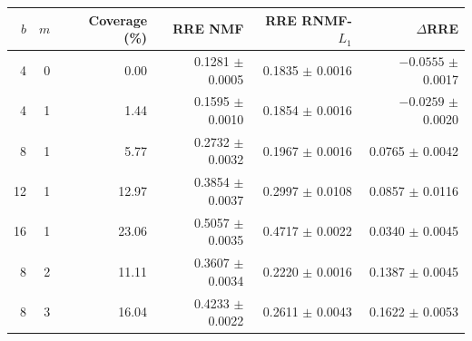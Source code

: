 \begin{tabular}{rrrrrr}
\toprule
$b$ & $m$ & Coverage (\%) & RRE NMF & RRE RNMF-$L_1$ & $\Delta$RRE \\
\midrule
4  & 0 & 0.00  & 0.1281 $\pm$ 0.0005 & 0.1835 $\pm$ 0.0016 & $-0.0555$ $\pm$ 0.0017 \\
4  & 1 & 1.44  & 0.1595 $\pm$ 0.0010 & 0.1854 $\pm$ 0.0016 & $-0.0259$ $\pm$ 0.0020 \\
8  & 1 & 5.77  & 0.2732 $\pm$ 0.0032 & 0.1967 $\pm$ 0.0016 & 0.0765 $\pm$ 0.0042 \\
12 & 1 & 12.97 & 0.3854 $\pm$ 0.0037 & 0.2997 $\pm$ 0.0108 & 0.0857 $\pm$ 0.0116 \\
16 & 1 & 23.06 & 0.5057 $\pm$ 0.0035 & 0.4717 $\pm$ 0.0022 & 0.0340 $\pm$ 0.0045 \\
8  & 2 & 11.11 & 0.3607 $\pm$ 0.0034 & 0.2220 $\pm$ 0.0016 & 0.1387 $\pm$ 0.0045 \\
8  & 3 & 16.04 & 0.4233 $\pm$ 0.0022 & 0.2611 $\pm$ 0.0043 & 0.1622 $\pm$ 0.0053 \\
\bottomrule
\end{tabular}
